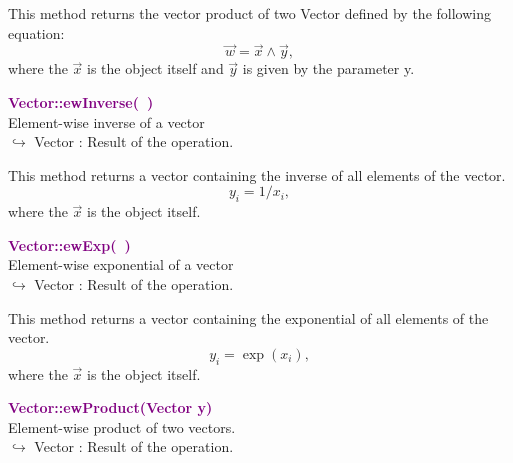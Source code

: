 This method returns the vector product of two Vector defined by the following equation:
\begin{equation*}
\overrightarrow{w} = \overrightarrow{x}\land\overrightarrow{y},
\end{equation*}
where the $\overrightarrow{x}$ is the object itself and $\overrightarrow{y}$ is given by the parameter y.

\textcolor{purple}{\textbf{Vector::ewInverse(~)}}\label{Vector::ewInverse()}\\
Element-wise inverse of a vector\\ \hspace*{10mm}$\hookrightarrow$ Vector : Result of the operation.

This method returns a vector containing the inverse of all elements of the vector.
\begin{equation*}
y_i = 1/x_i,
\end{equation*}
where the $\overrightarrow{x}$ is the object itself.

\textcolor{purple}{\textbf{Vector::ewExp(~)}}\label{Vector::ewExp()}\\
Element-wise exponential of a vector\\ \hspace*{10mm}$\hookrightarrow$ Vector : Result of the operation.

This method returns a vector containing the exponential of all elements of the vector.
\begin{equation*}
y_i = \exp(x_i),
\end{equation*}
where the $\overrightarrow{x}$ is the object itself.

\textcolor{purple}{\textbf{Vector::ewProduct(Vector y)}}\label{Vector::ewProduct(Vector y)}\\
Element-wise product of two vectors.\\ \hspace*{10mm}$\hookrightarrow$ Vector : Result of the operation.

